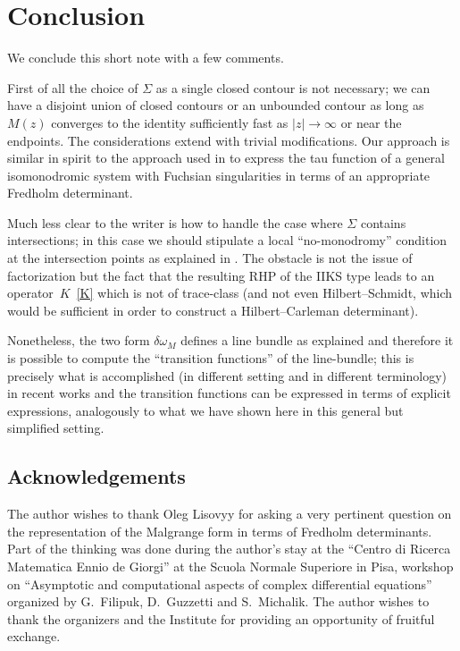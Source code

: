 \documentclass[pdftex]{sigma}
\numberwithin{equation}{section}
\begin{document}
\section{Conclusion}
We conclude this short note with a few comments.

First of all the choice of $\Sigma$ as a single closed contour is not necessary; we can have a disjoint union of closed contours or an unbounded contour as long as $M(z)$ converges to the identity suf\/f\/iciently fast as $|z|\to \infty$ or near the endpoints. The considerations extend with trivial modif\/ications. Our approach is similar in spirit to the approach used in \cite{GavrylenkoLisovyy} to express the tau function of a general isomonodromic system with Fuchsian singularities in terms of an appropriate Fredholm determinant.

Much less clear to the writer is how to handle the case where $\Sigma$ contains intersections; in this case we should stipulate a local ``no-monodromy'' condition at the intersection points as explained in \cite{BertolaIsoTau, BertolaCorrection}. The obstacle is not the issue of factorization but the fact that the resulting RHP of the IIKS type leads to an operator~$K$~\eqref{K} which is not of trace-class (and not even Hilbert--Schmidt, which would be suf\/f\/icient in order to construct a Hilbert--Carleman determinant).

Nonetheless, the two form $\delta \omega_M$ def\/ines a line bundle as explained and therefore it is possible to compute the ``transition functions'' of the line-bundle; this is precisely what is accomplished (in dif\/ferent setting and in dif\/ferent terminology) in recent works \cite{Its:2016kq, Its:2015qf} and the transition functions can be expressed in terms of explicit expressions, analogously to what we have shown here in this general but simplif\/ied setting.

\subsection*{Acknowledgements}
The author wishes to thank Oleg Lisovyy for asking a very pertinent question on the representation of the Malgrange form in terms of Fredholm determinants. Part of the thinking was done during the author's stay at the ``Centro di Ricerca Matematica Ennio de Giorgi'' at the Scuola Normale Superiore in Pisa, workshop on ``Asymptotic and computational aspects of complex dif\/ferential equations'' organized by G.~Filipuk, D.~Guzzetti and S.~Michalik. The author wishes to thank the organizers and the Institute for providing an opportunity of fruitful exchange.
\end{document}
